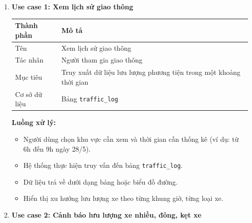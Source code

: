 \begin{enumerate}
    \item \textbf{Use case 1: Xem lịch sử giao thông}
    
    \begin{table}[H]
        \centering
        \begin{tabular}{|p{4cm}|p{10cm}|}
            \hline
            \textbf{Thành phần} & \textbf{Mô tả} \\ \hline
            Tên & Xem lịch sử giao thông \\ \hline
            Tác nhân & Người tham gia giao thông \\ \hline
            Mục tiêu & Truy xuất dữ liệu lưu lượng phương tiện trong một khoảng thời gian \\ \hline
            Cơ sở dữ liệu & Bảng \texttt{traffic\_log} \\ \hline
        \end{tabular}
    \end{table}
    
    \textbf{Luồng xử lý:}
    \begin{itemize}
        \item Người dùng chọn khu vực cần xem và thời gian cần thống kê (ví dụ: từ 6h đến 9h ngày 28/5).
        \item Hệ thống thực hiện truy vấn đến bảng \texttt{traffic\_log}.
        \item Dữ liệu trả về dưới dạng bảng hoặc biểu đồ đường.
        \item Hiển thị xu hướng lưu lượng xe theo từng khung giờ, từng loại xe.
    \end{itemize}
    
    \item \textbf{Use case 2: Cảnh báo lưu lượng xe nhiều, đông, kẹt xe}
    

\end{enumerate}
